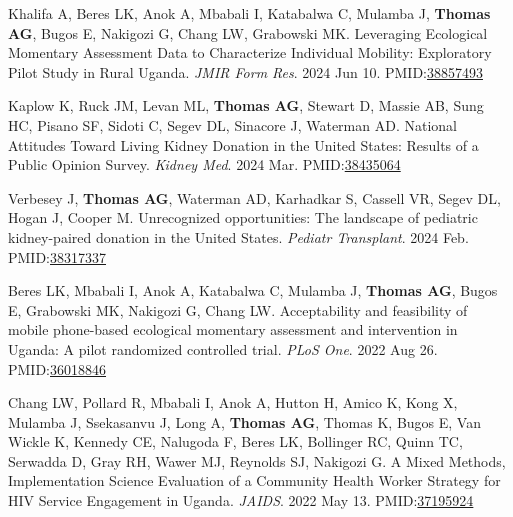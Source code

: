 \documentclass[10pt]{article}
\makeatletter
\newlength{\bibhang}
\newlength{\bibsep}
 {\@listi \global\bibsep\itemsep \global\advance\bibsep by\parsep}
\newenvironment{bibenum*}
  {\renewcommand\labelenumi{[\theenumi]}%
   \etaremune[
     topsep=0pt,
     itemsep=\bibsep,
     parsep=0pt,partopsep=0pt,
     itemindent=-\bibhang,
     leftmargin={\bibhang+\widthof{[999]}}]}
  {\endetaremune}
\newcommand{\pmid}[1]{PMID:\href{https://www.ncbi.nlm.nih.gov/pubmed/#1}{#1}}
\makeatother
\begin{document}
\begin{bibenum*}

\item Khalifa A, Beres LK, Anok A, Mbabali I, Katabalwa C, Mulamba J, 
  \textbf{Thomas AG}, Bugos E, Nakigozi G, Chang LW, Grabowski MK.
  Leveraging Ecological Momentary Assessment Data to Characterize Individual 
  Mobility: Exploratory Pilot Study in Rural Uganda. 
  \emph{JMIR Form Res}. 2024 Jun 10.
  \pmid{38857493} 

\item Kaplow K, Ruck JM, Levan ML, \textbf{Thomas AG}, Stewart D, Massie AB, 
  Sung HC, Pisano SF, Sidoti C, Segev DL, Sinacore J, Waterman AD. 
  National Attitudes Toward Living Kidney Donation in the United States: 
  Results of a Public Opinion Survey. 
  \emph{Kidney Med}. 2024 Mar.
  \pmid{38435064} 

\item Verbesey J, \textbf{Thomas AG}, Waterman AD, Karhadkar S, Cassell VR, 
  Segev DL, Hogan J, Cooper M. Unrecognized opportunities: 
  The landscape of pediatric kidney-paired donation in the United States. 
  \emph{Pediatr Transplant}. 2024 Feb.
  \pmid{38317337} 

\item Beres LK, Mbabali I, Anok A, Katabalwa C, Mulamba J, \textbf{Thomas AG}, 
  Bugos E, Grabowski MK, Nakigozi G, Chang LW.
  Acceptability and feasibility of mobile phone-based ecological momentary 
  assessment and intervention in Uganda: A pilot randomized controlled trial.
  \emph{PLoS One}. 2022 Aug 26.
  \pmid{36018846} 

\item Chang LW, Pollard R, Mbabali I, Anok A, Hutton H, 
  Amico K, Kong X, Mulamba J, Ssekasanvu J, Long A, 
  \textbf{Thomas AG}, Thomas K, Bugos E, Van Wickle K, 
  Kennedy CE, Nalugoda F, Beres LK, Bollinger RC, Quinn TC, 
  Serwadda D, Gray RH, Wawer MJ, Reynolds SJ, Nakigozi G.
  A Mixed Methods, Implementation Science Evaluation of a Community 
  Health Worker Strategy for HIV Service Engagement in Uganda.
  \emph{JAIDS}. 2022 May 13.
  \pmid{37195924} 
  

\end{bibenum*}
\end{document}
